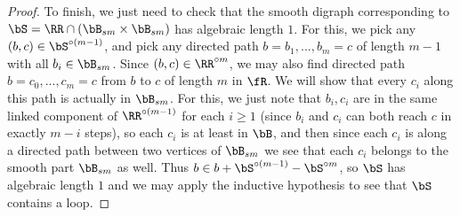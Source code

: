 \begin{proof}
To finish, we just need to check that the smooth digraph corresponding to $\bS = \RR \cap (\bB_{sm} \times \bB_{sm})$ has algebraic length $1$. For this, we pick any $(b,c) \in \bS^{\circ (m-1)}$, and pick any directed path $b = b_1, ..., b_m = c$ of length $m-1$ with all $b_i \in \bB_{sm}$. Since $(b,c) \in \RR^{\circ m}$, we may also find directed path $b = c_0, ..., c_m = c$ from $b$ to $c$ of length $m$ in $\fR$. We will show that every $c_i$ along this path is actually in $\bB_{sm}$. For this, we just note that $b_i,c_i$ are in the same linked component of $\RR^{\circ (m-1)}$ for each $i \ge 1$ (since $b_i$ and $c_i$ can both reach $c$ in exactly $m-i$ steps), so each $c_i$ is at least in $\bB$, and then since each $c_i$ is along a directed path between two vertices of $\bB_{sm}$ we see that each $c_i$ belongs to the smooth part $\bB_{sm}$ as well. Thus $b \in b + \bS^{\circ (m-1)} - \bS^{\circ m}$, so $\bS$ has algebraic length $1$ and we may apply the inductive hypothesis to see that $\bS$ contains a loop.
\end{proof}

